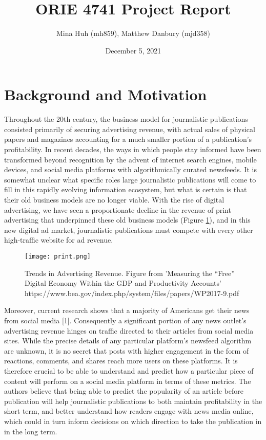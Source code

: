 \documentclass{article}
\title{ORIE 4741 Project Report}
\author{Mina Huh (mh859), Matthew Danbury (mjd358) }
\date{December 5, 2021}
\begin{document}
\maketitle

\section{Background and Motivation}
Throughout the 20th century, the business model for journalistic publications consisted primarily of securing advertising revenue, with actual sales of physical papers and magazines accounting for a much smaller portion of a publication's profitability. In recent decades, the ways in which people stay informed have been transformed beyond recognition by the advent of internet search engines, mobile devices, and social media platforms with algorithmically curated newsfeeds. It is somewhat unclear what specific roles large journalistic publications will come to fill in this rapidly evolving information ecosystem, but what is certain is that their old business models are no longer viable. With the rise of digital advertising, we have seen a proportionate decline in the revenue of print advertising that underpinned these old business models (Figure \ref{fig:print}), and in this new digital ad market, journalistic publications must compete with every other high-traffic website for ad revenue. 
\begin{figure}[h!]
    \centering
    \texttt{[image: print.png]}
    \caption{Trends in Advertising Revenue. Figure from 'Measuring the “Free” Digital Economy Within the GDP and Productivity Accounts' https://www.bea.gov/index.php/system/files/papers/WP2017-9.pdf}
    \label{fig:print}
\end{figure}
Moreover, current research shows that a majority of Americans get their news from social media [1]. Consequently a significant portion of any news outlet’s advertising revenue hinges on traffic directed to their articles from social media sites. While the precise details of any particular platform’s newsfeed algorithm are unknown, it is no secret that posts with higher engagement in the form of reactions, comments, and shares reach more users on these platforms. It is therefore crucial to be able to understand and predict how a particular piece of content will perform on a social media platform in terms of these metrics. The authors believe that being able to predict the popularity of an article before publication will help journalistic publications to both maintain profitability in the short term, and better understand how readers engage with news media online, which could in turn inform decisions on which direction to take the publication in in the long term.\\
\end{document}
